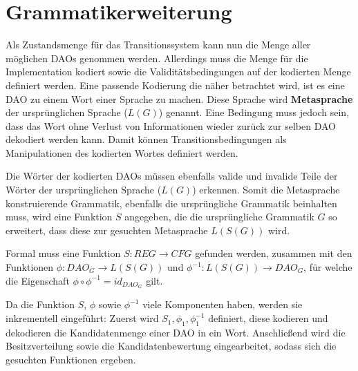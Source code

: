 \documentclass[a4paper,12pt]{report}
\begin{document}
% 

% 




\section{Grammatikerweiterung}
\label{gramerw}
Als Zustandsmenge für das Transitionssystem kann nun die Menge aller möglichen DAOs genommen werden. Allerdings muss die Menge für die Implementation kodiert sowie die Validitätsbedingungen auf der kodierten Menge definiert werden. Eine passende Kodierung die näher betrachtet wird, ist es eine DAO zu einem Wort einer Sprache zu machen. Diese Sprache wird \textbf{Metasprache} der ursprünglichen Sprache ($L(G)$) genannt. Eine Bedingung muss jedoch sein, dass das Wort ohne Verlust von Informationen wieder zurück zur selben DAO dekodiert werden kann. Damit können Transitionsbedingungen als Manipulationen des kodierten Wortes definiert werden. 

Die Wörter der kodierten DAOs müssen ebenfalls valide und invalide Teile der Wörter der ursprünglichen Sprache ($L(G)$) erkennen. Somit die Metasprache konstruierende Grammatik, ebenfalls die ursprüngliche Grammatik beinhalten muss, wird eine Funktion $S$ angegeben, die die ursprüngliche Grammatik $G$ so erweitert, dass diese zur gesuchten Metasprache $L(S(G))$ wird.

Formal muss eine Funktion $S: REG\rightarrow CFG$ gefunden werden, zusammen mit den Funktionen $\phi: DAO_G \rightarrow L(S(G))$ und $\phi^{-1}: L(S(G)) \rightarrow DAO_G$, für welche die Eigenschaft $\phi\circ\phi^{-1} = id_{DAO_G}$ gilt.

Da die Funktion $S$, $\phi$ sowie $\phi^{-1}$ viele Komponenten haben, werden sie inkrementell eingeführt: Zuerst wird $S_1, \phi_1, \phi^{-1}_1$ definiert, diese kodieren und dekodieren die Kandidatenmenge einer DAO in ein Wort. Anschließend wird die Besitzverteilung sowie die Kandidatenbewertung eingearbeitet, sodass sich die gesuchten Funktionen ergeben.
\end{document}
